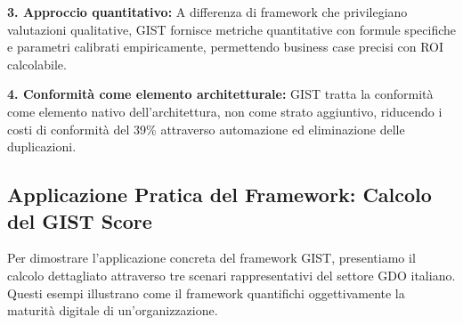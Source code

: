 \textbf{3. Approccio quantitativo:} A differenza di framework che privilegiano valutazioni qualitative, GIST fornisce metriche quantitative con formule specifiche e parametri calibrati empiricamente, permettendo business case precisi con ROI calcolabile.

\textbf{4. Conformità come elemento architetturale:} GIST tratta la conformità come elemento nativo dell'architettura, non come strato aggiuntivo, riducendo i costi di conformità del 39\% attraverso automazione ed eliminazione delle duplicazioni.

\subsection{Applicazione Pratica del Framework: Calcolo del GIST Score}
\label{subsec:5.3.4}

Per dimostrare l'applicazione concreta del framework GIST, presentiamo il calcolo dettagliato attraverso tre scenari rappresentativi del settore GDO italiano. Questi esempi illustrano come il framework quantifichi oggettivamente la maturità digitale di un'organizzazione.

